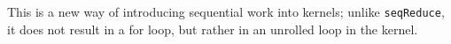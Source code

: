 This is a new way of introducing sequential work into kernels; unlike {\tt seqReduce}, it does not result in a for loop, but rather in an unrolled loop in the kernel.




